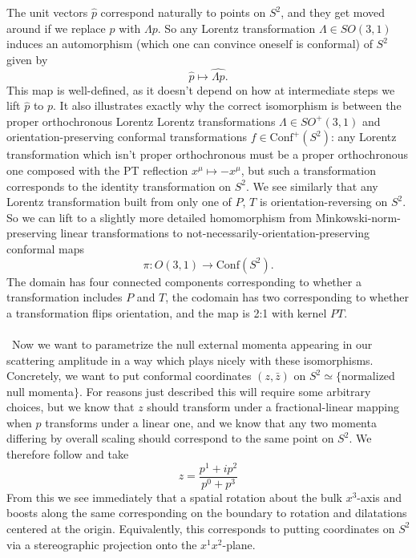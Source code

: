 \documentclass[11pt,letterpaper]{article}
\begin{document}
The unit vectors $\hat{p}$ correspond naturally to points on $S^2$, and they get moved around if we replace $p$ with $\Lambda p$. So any Lorentz transformation $\Lambda \in SO(3,1)$ induces an automorphism (which one can convince oneself is conformal) of $S^2$ given by \begin{equation}
\hat{p} \mapsto \widehat{\Lambda p}.
\end{equation}
This map is well-defined, as it doesn't depend on how at intermediate steps we lift $\hat{p}$ to $p$. It also illustrates exactly why the correct isomorphism is between the proper orthochronous Lorentz Lorentz transformations $\Lambda \in SO^+(3,1)$ and orientation-preserving conformal transformations $f \in \mbox{Conf}^+(S^2)$: any Lorentz transformation which isn't proper orthochronous must be a proper orthochronous one composed with the PT reflection $x^\mu \mapsto - x^\mu$, but such a transformation corresponds to the identity transformation on $S^2$. We see similarly that any Lorentz transformation built from only one of $P$, $T$ is orientation-reversing on $S^2$. So we can lift to a slightly more detailed homomorphism from Minkowski-norm-preserving linear transformations to not-necessarily-orientation-preserving conformal maps \begin{equation}
\pi: O(3,1) \to \mbox{Conf}(S^2).
\end{equation}
The domain has four connected components corresponding to whether a transformation includes $P$ and $T$, the codomain has two corresponding to whether a transformation flips orientation, and the map is 2:1 with kernel $PT$. \\
\\
\
Now we want to parametrize the null external momenta appearing in our scattering amplitude in a way which plays nicely with these isomorphisms. Concretely, we want to put conformal coordinates $(z, \bar{z})$ on $S^2 \simeq \{$normalized null momenta$\}$. For reasons just described this will require some arbitrary choices, but we know that $z$ should transform under a fractional-linear mapping when $p$ transforms under a linear one, and we know that any two momenta differing by overall scaling should correspond to the same point on $S^2$. We therefore follow \cite{Pasterski:2016qvg} and take \begin{equation}
z = \frac{p^1 + i p^2}{p^0 + p^3}
\end{equation}
From this we see immediately that a spatial rotation about the bulk $x^3$-axis and boosts along the same corresponding on the boundary to rotation and dilatations centered at the origin. Equivalently, this corresponds to putting coordinates on $S^2$ via a stereographic projection onto the $x^1 x^2$-plane. \\
\end{document}
